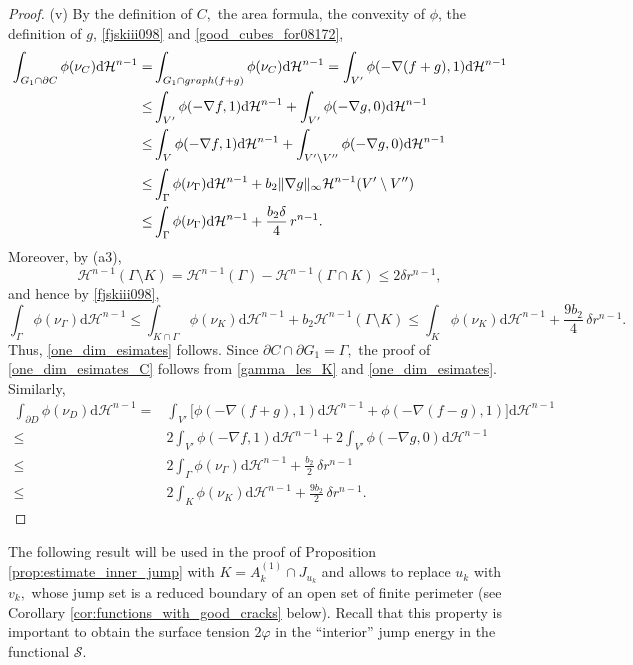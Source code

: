 \documentclass[reqno]{amsart}
\numberwithin{equation}{section}
\theoremstyle{plain}
\theoremstyle{definition}
\newcommand{\cH}{\mathcal{H}}
\newcommand{\cS}{\mathcal{S}}
\newcommand{\p}{\partial}
\newcommand{\bound}{b}
\renewcommand{\d}{\mathrm{d}}
\begin{document}
\begin{proof}
(v)  By the definition of $C,$ the area formula, the convexity of $\phi$, the definition of $g$, \eqref{fjskiii098} and \eqref{good_cubes_for08172},
%
\begin{align*}
\int_{G_1\cap \p C}\phi(\nu_C)\d\cH^{n-1} = & \int_{G_1\cap {\rm graph}(f+g)} \phi(\nu_C)\d\cH^{n-1}=\int_{V'} \phi(-\nabla(f+g),1)\d\cH^{n-1}\\
\le & \int_{V'} \phi(-\nabla f,1)\d\cH^{n-1} + \int_{V'} \phi(-\nabla g,0)\d\cH^{n-1}\\
\le& \int_{V} \phi(-\nabla f,1)\d\cH^{n-1} + \int_{V'\setminus V''} \phi(-\nabla g,0)\d\cH^{n-1}\\
\le & \int_\Gamma \phi(\nu_\Gamma)\d\cH^{n-1} + \bound_2\|\nabla g\|_\infty \cH^{n-1}(V'\setminus V'')\\
\le & \int_\Gamma \phi(\nu_\Gamma)\d\cH^{n-1} + \frac{\bound_2 \delta}{4}\,r^{n-1}.
\end{align*}
Moreover, by (a3),
\begin{equation*} 
\cH^{n-1}(\Gamma\setminus K) = \cH^{n-1}(\Gamma) - \cH^{n-1}(\Gamma\cap K) \le 2\delta r^{n-1}, 
\end{equation*}
%
and hence by \eqref{fjskiii098},
%
\begin{equation}\label{gamma_les_K}
\int_\Gamma \phi(\nu_\Gamma)\d\cH^{n-1} \le 
\int_{K\cap\Gamma} \phi(\nu_K)\d\cH^{n-1} + 
\bound_2\cH^{n-1}(\Gamma\setminus K) \le 
\int_K \phi(\nu_K)\d\cH^{n-1} + \frac{9\bound_2}{4}\,\delta r^{n-1}. 
\end{equation}
%
Thus, \eqref{one_dim_esimates} follows. Since $\p C\cap \p G_1=\Gamma,$ the proof of \eqref{one_dim_esimates_C} follows from \eqref{gamma_les_K} and \eqref{one_dim_esimates}. Similarly,
\begin{align*}
\int_{\p D}\phi(\nu_D)\d\cH^{n-1} = & \int_{V'}\Big[\phi(-\nabla (f+g),1)\d\cH^{n-1} + \phi(-\nabla(f-g),1)\Big]\d\cH^{n-1}\\
\le & 2 \int_{V'} \phi(-\nabla f,1)\d\cH^{n-1} 
+ 2\int_{V'}\phi(-\nabla g,0)\d\cH^{n-1}\\
\le& 2\int_\Gamma\phi(\nu_\Gamma)\d\cH^{n-1} +\frac{\bound_2}{2}\,\delta r^{n-1}\\
\le & 2\int_K\phi(\nu_K)\d\cH^{n-1} +\frac{9\bound_2}{2}\,\delta r^{n-1}.
\end{align*} 
\end{proof}
 



The following result will be used in the proof of Proposition \ref{prop:estimate_inner_jump} with $K=A_k^{(1)}\cap J_{u_k}$ and allows to replace $u_k$ with $v_k,$ whose jump set is a reduced boundary of an open set of finite perimeter (see Corollary \ref{cor:functions_with_good_cracks} below). Recall that this property is important to obtain the surface tension $2\varphi$ in the ``interior'' jump energy in the functional $\cS.$
\end{document}
